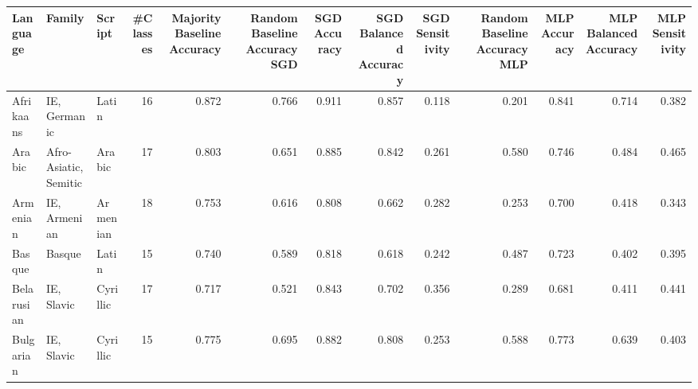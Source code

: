 \begin{tabular}{lllrrrrrrrrrr}
\toprule
                       Language &                          Family &                Script &  #Classes &  Majority Baseline Accuracy &  Random Baseline Accuracy SGD &  SGD Accuracy &  SGD Balanced Accuracy &  SGD Sensitivity &  Random Baseline Accuracy MLP &  MLP Accuracy &  MLP Balanced Accuracy &  MLP Sensitivity \\
\midrule
                      Afrikaans &                    IE, Germanic &                 Latin &        16 &                       0.872 &                         0.766 &         0.911 &                  0.857 &            0.118 &                         0.201 &         0.841 &                  0.714 &            0.382 \\
                         Arabic &           Afro-Asiatic, Semitic &                Arabic &        17 &                       0.803 &                         0.651 &         0.885 &                  0.842 &            0.261 &                         0.580 &         0.746 &                  0.484 &            0.465 \\
                       Armenian &                    IE, Armenian &              Armenian &        18 &                       0.753 &                         0.616 &         0.808 &                  0.662 &            0.282 &                         0.253 &         0.700 &                  0.418 &            0.343 \\
                         Basque &                          Basque &                 Latin &        15 &                       0.740 &                         0.589 &         0.818 &                  0.618 &            0.242 &                         0.487 &         0.723 &                  0.402 &            0.395 \\
                     Belarusian &                      IE, Slavic &              Cyrillic &        17 &                       0.717 &                         0.521 &         0.843 &                  0.702 &            0.356 &                         0.289 &         0.681 &                  0.411 &            0.441 \\
                      Bulgarian &                      IE, Slavic &              Cyrillic &        15 &                       0.775 &                         0.695 &         0.882 &                  0.808 &            0.253 &                         0.588 &         0.773 &                  0.639 &            0.403 \\

\end{tabular}

